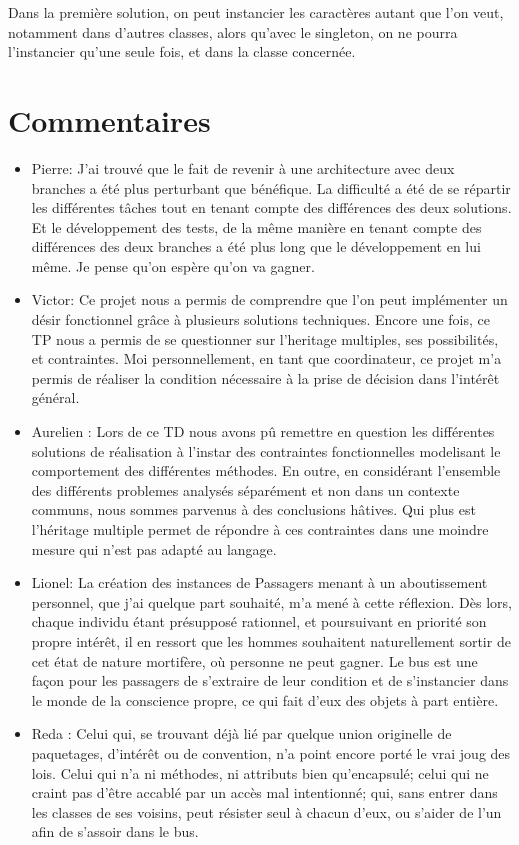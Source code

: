 \documentclass[a4paper,11pt]{article}
\begin{document}
Dans la première solution, on peut instancier les caractères autant que l'on veut, notamment dans d'autres classes, alors qu'avec le singleton, on ne pourra l'instancier qu'une seule fois, et dans la classe concernée.

\section{Commentaires}

\begin{itemize}
\item Pierre: J'ai trouvé que le fait de revenir à une architecture avec deux branches a été plus perturbant que bénéfique. La difficulté a été de se répartir les différentes tâches tout en tenant compte des différences des deux solutions. Et le développement des tests, de la même manière en tenant compte des différences des deux branches a été plus long que le développement en lui même. Je pense qu'on espère qu'on va gagner.
\item Victor: Ce projet nous a permis de comprendre que l'on peut implémenter un désir fonctionnel grâce à plusieurs solutions techniques. Encore une fois, ce TP nous a permis de se questionner sur l'heritage multiples, ses possibilités, et contraintes. Moi personnellement, en tant que coordinateur, ce projet m'a permis de réaliser la condition nécessaire à la prise de décision dans l'intérêt général.
\item Aurelien :  Lors de ce TD nous avons pû remettre en question les différentes solutions de réalisation à l'instar des contraintes fonctionnelles modelisant le comportement des différentes méthodes. En outre, en considérant l'ensemble des différents problemes analysés séparément et non dans un contexte communs, nous sommes parvenus à des conclusions hâtives. Qui plus est l'héritage multiple permet de répondre à ces contraintes dans une moindre mesure qui n'est pas adapté au langage.
\item Lionel: La création des instances de Passagers menant à un aboutissement personnel, que j'ai quelque part souhaité, m'a mené à cette réflexion. Dès lors, chaque individu étant présupposé rationnel, et poursuivant en priorité son propre intérêt, il en ressort que les hommes souhaitent naturellement sortir de cet état de nature mortifère, où personne ne peut gagner. Le bus est une façon pour les passagers de s'extraire de leur condition et de s'instancier dans le monde de la conscience propre, ce qui fait d'eux des objets à part entière.
\item Reda : Celui qui, se trouvant déjà lié par quelque union originelle de paquetages, d'intérêt ou de convention, n'a point encore porté le vrai joug des lois. Celui qui n'a ni méthodes, ni attributs bien qu'encapsulé; celui qui ne craint pas d'être accablé par un accès mal intentionné; qui, sans entrer dans les classes de ses voisins, peut résister seul à chacun d'eux, ou s'aider de l'un afin de s'assoir dans le bus.

\end{itemize}
\end{document}
